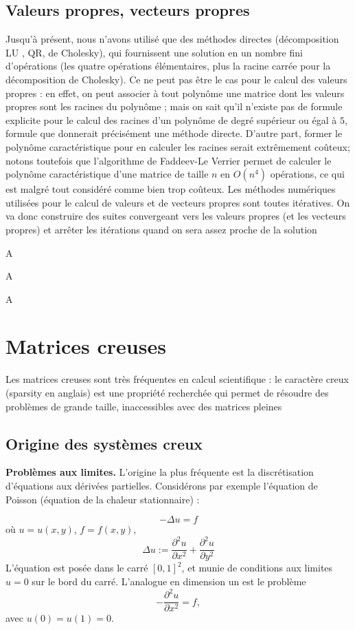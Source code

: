 \subsection{Valeurs propres, vecteurs propres}
Jusqu'à présent, nous n'avons utilisé que des méthodes directes (décomposition LU , QR, de Cholesky), qui fournissent une solution en un nombre fini d'opérations (les quatre opérations élémentaires, plus la racine carrée pour la décomposition de
Cholesky). Ce ne peut pas être le cas pour le calcul des valeurs propres : en effet, on peut associer à tout polynôme une matrice dont les valeurs propres sont les racines du polynôme ; mais on sait qu'il n'existe pas de formule explicite pour le calcul des racines d'un polynôme de degré supérieur ou égal à $5$, formule que donnerait précisément une méthode directe. D'autre part, former le polynôme caractéristique pour en calculer les racines serait extrêmement coûteux; notons toutefois que l'algorithme de Faddeev-Le Verrier permet de calculer le polynôme caractéristique d'une matrice de taille $n$ en $O\left(n^{4}\right)$ opérations, ce qui est malgré tout considéré comme bien trop coûteux. Les méthodes numériques
utilisées pour le calcul de valeurs et de vecteurs propres sont toutes itératives. On va donc construire des suites convergeant vers les valeurs propres (et les vecteurs propres) et arrêter les itérations quand on sera assez proche de la
solution
\begin{exercise}
A
\end{exercise}
\begin{exercise}
A
\end{exercise}
\begin{exercise}
A
\end{exercise}
\section{Matrices creuses}
Les matrices creuses sont très fréquentes en calcul scientifique : le caractère creux (sparsity en anglais) est une propriété recherchée qui permet de résoudre des problèmes de grande taille, inaccessibles avec des matrices pleines

\subsection{Origine des systèmes creux}
\begin{flushright}
\textbf{Problèmes aux limites.} L'origine la plus fréquente est la discrétisation d'équations aux dérivées partielles. Considérons par exemple l'équation de Poisson (équation de la chaleur stationnaire) :
\end{flushright}
\[
-\Delta u = f
\]
où $u= u\left(x, y\right)$, $f=f\left(x, y\right)$,
\[
\Delta u := \frac{\partial^{2}u}{\partial x^{2}} + \frac{\partial^{2}u}{\partial y^{2}}
\]
L'équation est posée dans le carré $\left[0, 1\right]^{2}$, et munie de conditions aux limites $u=0$ sur le bord du carré. L'analogue en dimension un est le problème
\begin{equation}
-\frac{\partial^{2}u}{\partial x^{2}} = f,
\end{equation}
avec $u\left(0\right) = u\left(1\right) = 0$.

